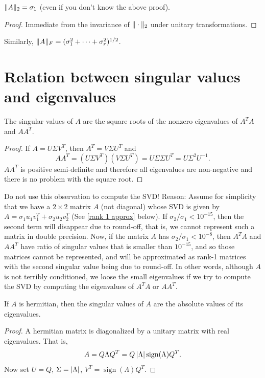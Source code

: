 \documentclass{article}
\begin{document}
\begin{lemma}
$\| A \|_{2} = \sigma_{1}$ (even if you don't know the above
proof).
\end{lemma}
\begin{proof}
Immediate from the invariance of $\| \cdot \|_{2}$ under unitary
transformations.
\end{proof}
Similarly, $\| A \|_{F} = (\sigma_{1}^{2} + \cdots +
\sigma_{r}^{2})^{1/2}$.

\section{Relation between singular values and eigenvalues}
\begin{lemma}
The singular values of $A$ are the square roots of the nonzero
eigenvalues of $A^{T}A$ and $AA^{T}$.
\end{lemma}
\begin{proof}
If $A=U \Sigma V^{T}$, then $A^{T}=V \Sigma U^{T}$ and
\begin{equation*}
AA^{T} = \left (  U \Sigma V^{T} \right ) \left ( V \Sigma U^{T}
\right ) = U \Sigma \Sigma U^{T} = U \Sigma^{2} U^{-1}.
\end{equation*}
$AA^{T}$ is positive semi-definite and therefore all eigenvalues are
non-negative and there is no problem with the square root.
\end{proof}

Do not use this observation to compute the SVD! Reason: Assume for
simplicity that we have a $2 \times 2$ matrix $A$ (not diagonal)
whose SVD is given by $A = \sigma_{1} u_{1} v_{1}^{T} + \sigma_{2}
u_{2} v_{2}^{T}$ (See \ref{rank 1 approx} below). If
$\sigma_{2}/\sigma_{1} < 10^{-15}$, then the second term will
disappear due to round-off, that is, we cannot represent such a
matrix in double precision. Now, if the matrix $A$ has
$\sigma_{2}/\sigma_{1} < 10^{-8}$, then $A^{T}A$ and $AA^{T}$ have
ratio of singular values that is smaller than $10^{-15}$, and so
those matrices cannot be represented, and will be approximated as
rank-1 matrices with the second singular value being due to
round-off. In other words, although $A$ is not terribly conditioned,
we loose the small eigenvalues if we try to compute the SVD by
computing the eigenvalues of $A^{T}A$ or $AA^{T}$.

\begin{lemma}
If $A$ is hermitian, then the singular values of $A$ are the
absolute values of its eigenvalues.
\end{lemma}
\begin{proof}
A hermitian matrix is diagonalized by a unitary matrix with real
eigenvalues. That is,
\begin{equation*}
A=Q \Lambda Q^{T} = Q \left| \Lambda \right| \operatorname{sign}(\Lambda)
Q^{T}.
\end{equation*}
Now set $U=Q$, $\Sigma=\left| \Lambda \right|$,
$V^{T}=\operatorname{sign}(\Lambda) Q^{T}$.
\end{proof}
\end{document}
